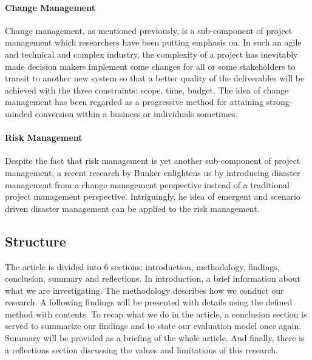 \paragraph{Change Management}
Change management, as mentioned previously, is a sub-component of project management which researchers\parencite{3,6} have been putting emphasis on. In such an agile and technical and complex industry, the complexity of a project has inevitably made decision makers implement some changes for all or some stakeholders to transit to another new system\parencite[p. 1]{3} so that a better quality of the deliverables will be achieved with the three constraints: scope, time, budget. The idea of change management has been regarded as a progressive method for attaining strong-minded
conversion within a business or individuals sometimes\parencite[p. 3]{3}.

\paragraph{Risk Management}
Despite the fact that risk management is yet another sub-component of project management, a recent research by Bunker enlightens us by introducing disaster management from a change management perspective instead of a traditional project management perspective\parencite[p. 10]{6}. Intriguingly, he idea of emergent and scenario driven disaster management can be applied to the risk management.

\subsection{Structure}
The article is divided into 6 sections: introduction, methodology, findings, conclusion, summary and reflections. In introduction, a brief information about what we are investigating. The methodology describes how we conduct our research. A following findings will be presented with details using the defined method with contents. To recap what we do in the article, a conclusion section is served to summarize our findings and to state our evaluation model once again. Summary will be provided as a briefing of the whole article. And finally, there is a reflections section discussing the values and limitations of this research.